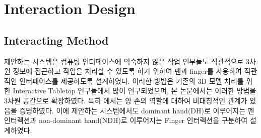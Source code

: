 
\section{Interaction Design}

\subsection{Interacting Method}



제안하는 시스템은 컴퓨팅 인터페이스에 익숙하지 않은 작업 인부들도 직관적으로 3차원 정보에 접근하고 작업을 처리할 수 있도록 하기 위하여 펜과 finger를 사용하여 직관적인 인터페이스를 제공하도록 설계하였다. 이러한 방법은 기존의 3D 모델 처리를 위한 Interactive Tabletop 연구들\cite{brandl_combining_2008, lopes_combining_2011}에서 많이 연구되었으며, 본 논문에서는 이러한 방법을 3차원 공간으로 확장하였다. 특히 \cite{guiard_asymmetric_1987}에서는 양 손의 역할에 대하여 비대칭적인 관계가 있음을 증명하였다. 이에 제안하는 시스템에서도 dominant hand(DH)로 이루어지는 펜 인터렉션과 non-dominant hand(NDH)로 이루어지는 Finger 인터렉션을 구분하여 설계하였다.



